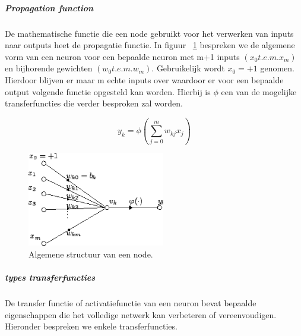 			\subparagraph{Propagation function}
			De mathematische functie die een node gebruikt voor het verwerken van inputs naar outputs heet de propagatie functie.
			In figuur ~\ref{fig:artificial_neuron} bespreken we de algemene vorm van een neuron voor een bepaalde neuron met m+1 inputs $\left(  x_0 t.e.m. x_m \right) $ en bijhorende gewichten $\left(  w_0 t.e.m. w_m \right) $.
			Gebruikelijk wordt $x_0 = +1$ genomen. Hierdoor blijven er maar m echte inputs over waardoor er voor een bepaalde output volgende functie opgesteld kan worden. Hierbij is $\phi$ een van de mogelijke transferfuncties die verder besproken zal worden.

			\begin{equation}
				y_k = \phi \left( \sum_{j=0}^{m}w_{kj}x_j\right) 
			\end{equation}
			
			\begin{figure}
				\centering
				\includegraphics[width=60mm]{afbeeldingen/Artificial_neuron.PNG}
				\caption{Algemene structuur van een node.}
				\label{fig:artificial_neuron}
			\end{figure}
			
			\subparagraph{types transferfuncties}
			De transfer functie of activatiefunctie van een neuron bevat bepaalde eigenschappen die het volledige netwerk kan verbeteren of vereenvoudigen. Hieronder bespreken we enkele transferfuncties.
			
